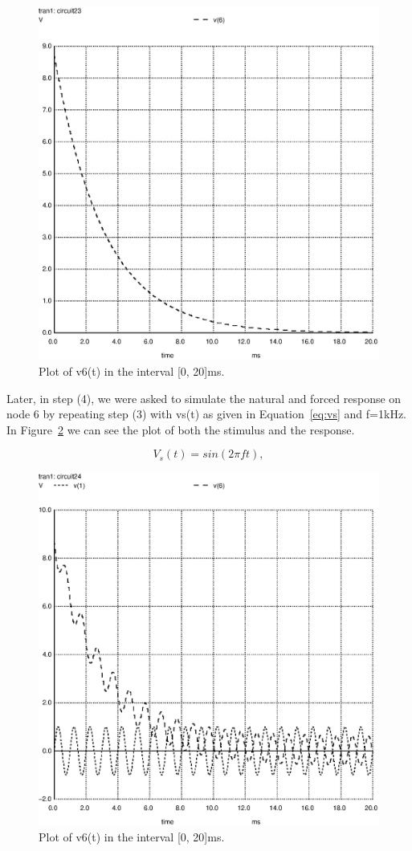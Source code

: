 \begin{figure}[h] \centering
\includegraphics[width=0.8\linewidth]{naturalsolution.eps}
\caption{Plot of v6(t) in the interval [0, 20]ms.}
\label{fig:plotS(3)}
\end{figure}

Later, in step (4), we were asked to simulate the natural and forced response on node 6 by repeating step (3) with vs(t) as given in Equation~\ref{eq:vs} and f=1kHz. In Figure~\ref{fig:plotS(4)} we can see the plot of both the stimulus and the response.

\begin{equation}
  V_{s}(t) = sin(2 \pi f t),
  \label{eq:vs}
\end{equation}

\begin{figure}[h] \centering
\includegraphics[width=0.8\linewidth]{forcedsolution.eps}
\caption{Plot of v6(t) in the interval [0, 20]ms.}
\label{fig:plotS(4)}
\end{figure}

